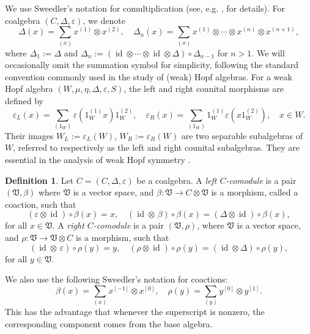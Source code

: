\documentclass[a4paper,11pt]{article}
\theoremstyle{definition}
\newtheorem{definition}[theorem]{Definition}
\theoremstyle{remark}
\newcommand{\id}{\operatorname{id}}
\begin{document}
We use Sweedler's notation for comultiplication (see, e.g. \cite{montgomery1993hopf}, for details). For coalgebra $(C,\Delta,\varepsilon)$, we denote 
\begin{equation}
    \Delta(x) = \sum_{(x)}x^{(1)}\otimes x^{(2)},\quad \Delta_{n}(x) = \sum_{(x)}x^{(1)}\otimes \cdots \otimes x^{(n)}\otimes x^{(n+1)},
\end{equation}
where $\Delta_1 := \Delta$ and $\Delta_n := (\id \otimes \cdots \otimes \id \otimes \Delta)\circ \Delta_{n-1}$ for $n>1$. 
We will occasionally omit the summation symbol for simplicity, following the standard convention commonly used in the study of (weak) Hopf algebras.
For a weak Hopf algebra $(W,\mu,\eta,\Delta,\varepsilon,S)$, the left and right counital morphisms are defined by 
\begin{equation}
    \varepsilon_L(x) = \sum_{(1_W)}\varepsilon(1_W^{(1)}x)1_W^{(2)},\quad \varepsilon_R(x) = \sum_{(1_W)}1_W^{(1)}\varepsilon(x1_W^{(2)}),\quad x\in W.
\end{equation}
Their images $W_L:=\varepsilon_L(W)$, $W_R:=\varepsilon_R(W)$ are two separable subalgebras of $W$, referred to respectively as the left and right counital subalgebras. They are essential in the analysis of weak Hopf symmetry \cite{Jia2023weak}.


\begin{definition}
    Let $C=(C,\Delta,\varepsilon)$ be a coalgebra. A \textit{left $C$-comodule} is a pair $(\mathfrak{V},\beta)$ where $\mathfrak{V}$ is a vector space, and  $\beta:\mathfrak{V}\to C\otimes \mathfrak{V}$ is a morphism, called a coaction, such that 
    \begin{equation}
        (\varepsilon\otimes \id)\circ \beta(x) = x,\quad (\id\otimes \,\beta)\circ \beta(x) = (\Delta\otimes \id)\circ \beta(x),
    \end{equation}
    for all $x\in \mathfrak{V}$. A \textit{right $C$-comodule} is a pair $(\mathfrak{V},\rho)$, where $\mathfrak{V}$ is a vector space, and $\rho:\mathfrak{V}\to \mathfrak{V}\otimes C$ is a morphism, such that 
    \begin{equation}
        (\id\otimes \,\varepsilon)\circ\rho(y)  = y,\quad (\rho \otimes \id)\circ\rho(y) = (\id\otimes \Delta)\circ \rho(y),
    \end{equation}
    for all $y\in \mathfrak{V}$.
\end{definition}

We also use the following Sweedler's notation for coactions:
\begin{equation}
    \beta(x) = \sum_{(x)}x^{[-1]}\otimes x^{[0]},\quad \rho(y) = \sum_{(y)}y^{[0]}\otimes y^{[1]}.
\end{equation}
This has the advantage that whenever the superscript is nonzero, the corresponding component comes from the base algebra. 
\end{document}

